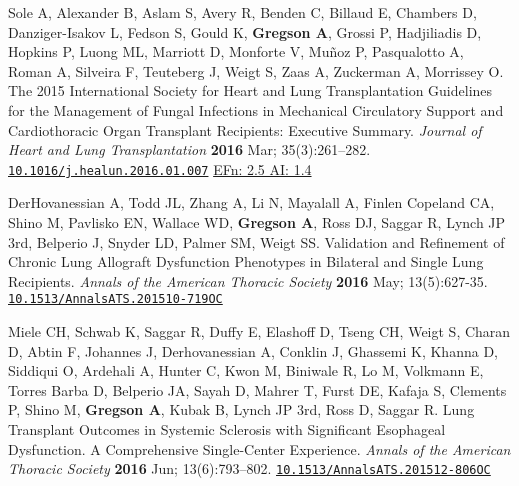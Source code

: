 \documentclass[letterpaper,11pt,sans,final]{/usr/local/share/texmf-dist/tex/latex/moderncv/moderncv}%
\begin{document}
\begin{thebibliography}{1}
  \bibitem[30]{} Sole A, Alexander B, Aslam S, Avery R, Benden C, Billaud E, Chambers D, Danziger-Isakov L, Fedson S, Gould K, \textbf{Gregson A}, Grossi P, Hadjiliadis D, Hopkins P, Luong ML, Marriott D, Monforte V, Mu\~{n}oz P, Pasqualotto A, Roman A, Silveira F, Teuteberg J, Weigt S, Zaas A, Zuckerman A, Morrissey O. The 2015 International Society for Heart and Lung Transplantation Guidelines for the Management of Fungal Infections in Mechanical Circulatory Support and Cardiothoracic Organ Transplant Recipients: Executive Summary.  {\color{BrickRed}\textit{Journal of Heart and Lung Transplantation}} \textbf{2016} Mar; 35(3):261--282. \href{http://www.sciencedirect.com/science/article/pii/S1053249816000541}{\nolinkurl{10.1016/j.healun.2016.01.007}}
    {\color{NavyBlue} \href{http://www.eigenfactor.org/rankings.php?search=JOURNAL+OF+HEART+AND+LUNG+TRANSPLANTATION&search2=&search3=&searchby=journal}{{\smaller EFn: 2.5 AI: 1.4}}
    }

  \bibitem[31]{} DerHovanessian A, Todd JL, Zhang A, Li N, Mayalall A, Finlen Copeland CA, Shino M, Pavlisko EN, Wallace WD, \textbf{Gregson A}, Ross DJ, Saggar R, Lynch JP 3rd, Belperio J, Snyder LD, Palmer SM, Weigt SS. Validation and Refinement of Chronic Lung Allograft Dysfunction Phenotypes in Bilateral and Single Lung Recipients. {\color{BrickRed}\textit{Annals of the American Thoracic Society}} \textbf{2016} May; 13(5):627-35. \href{http://www.atsjournals.org/doi/10.1513/AnnalsATS.201510-719OC#.V3wodPEjW5M}{\nolinkurl{10.1513/AnnalsATS.201510-719OC}} 

\bibitem[32]{} Miele CH, Schwab K, Saggar R, Duffy E, Elashoff D, Tseng CH, Weigt S, Charan D, Abtin F, Johannes J, Derhovanessian A, Conklin J, Ghassemi K, Khanna D, Siddiqui O, Ardehali A, Hunter C, Kwon M, Biniwale R, Lo M, Volkmann E, Torres Barba D, Belperio JA, Sayah D, Mahrer T, Furst DE, Kafaja S, Clements P, Shino M, \textbf{Gregson A}, Kubak B, Lynch JP 3rd, Ross D, Saggar R. Lung Transplant Outcomes in Systemic Sclerosis with Significant Esophageal Dysfunction. A Comprehensive Single-Center Experience. {\color{BrickRed}\textit{Annals of the American Thoracic Society}} \textbf{2016} Jun; 13(6):793--802. \href{http://www.atsjournals.org/doi/10.1513/AnnalsATS.201512-806OC#.V3wkRvEjW5M}{\nolinkurl{10.1513/AnnalsATS.201512-806OC}}


\end{thebibliography}
\end{document}
